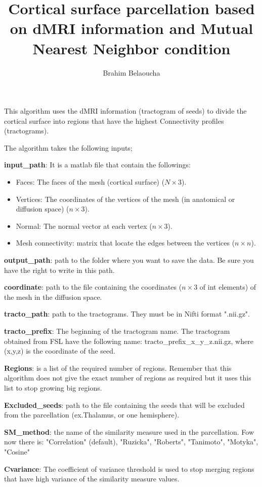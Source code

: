 \documentclass[a4paper,10pt]{article}
\title{Cortical surface parcellation based on dMRI information and Mutual Nearest Neighbor condition}
\author{Brahim Belaoucha}
\begin{document}
\maketitle

This algorithm uses the dMRI information (tractogram of seeds) to divide the cortical surface into regions that have the highest Connectivity profiles (tractograms).

The algorithm takes the following inputs;


 \textbf{input\_path}: It is a matlab file that contain the followings:
\begin{itemize}
 \item Faces: The faces of the mesh (cortical surface) ($N\times 3$).
 \item Vertices: The coordinates of the vertices of the mesh (in anatomical or diffusion space) ($n\times 3$).
 \item Normal: The normal vector at each vertex ($n\times 3$).
 \item Mesh connectivity: matrix that locate the edges between the vertices ($n\times n$).
\end{itemize}

 \textbf{output\_path}: path to the folder where you want to save the data. Be sure you have the right to write in this path.

 \textbf{coordinate}: path to the file containing the coordinates ($n\times 3$ of int elements) of the mesh in the diffusion space. 

 \textbf{tracto\_path}: path to the tractograms. They must be in Nifti format ".nii.gz".

 \textbf{tracto\_prefix}: The beginning of the tractogram name. The tractogram obtained from FSL have the following name: tracto\_prefix\_x\_y\_z.nii.gz, where 
(x,y,z) is the coordinate of the seed.

 \textbf{Regions}: is a list of the required number of regions. Remember that this algorithm does not give the exact number of regions as required but it uses
this list to stop growing big regions.

 \textbf{Excluded\_seeds}: path to the file containing the seeds that will be excluded from the parcellation (ex.Thalamus, or one hemisphere).  

 \textbf{SM\_method}: the name of the similarity measure used in the parcellation. Fow now there is: "Correlation" (default), "Ruzicka", "Roberts", "Tanimoto", "Motyka", "Cosine"

 \textbf{Cvariance}: The coefficient of variance threshold is used to stop merging regions that have high variance of the similarity measure values. 
\end{document}

